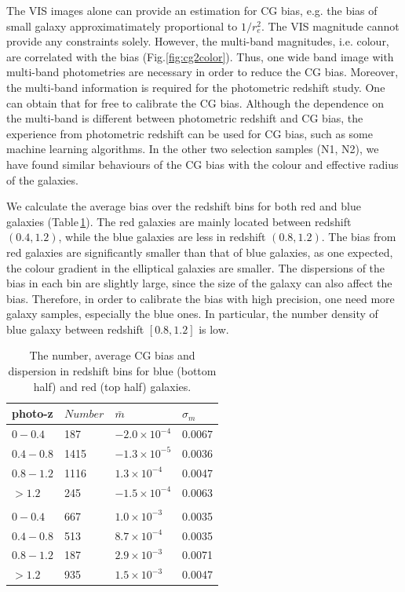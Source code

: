 \documentclass[useAMS,usenatbib]{mn2e}
\begin{document}
The VIS images alone can provide an estimation for CG bias, e.g. the
bias of small galaxy approximatimately proportional to $1/r_e^2$. The
VIS magnitude cannot provide any constraints solely. However, the multi-band
magnitudes, i.e. colour, are correlated with the bias
(Fig.\ref{fig:cg2color}). Thus, one wide band image with multi-band
photometries are necessary in order to reduce the CG bias. Moreover, the
multi-band information is required for the photometric redshift
study. One can obtain that for free to calibrate the CG bias. Although
the dependence on the multi-band is different between photometric
redshift and CG bias, the experience from photometric redshift can be
used for CG bias, such as some machine learning algorithms. In the other two
selection samples (N1, N2), we have found similar behaviours of the CG bias
with the colour and effective radius of the galaxies.



We calculate the average bias over the redshift bins for both red and
blue galaxies (Table\,\ref{table:calibration}). The red galaxies
are mainly located between redshift $(0.4,1.2)$, while the blue galaxies
are less in redshift $(0.8,1.2)$. The bias from red galaxies are
significantly smaller than that of blue galaxies, as one expected, the
colour gradient in the elliptical galaxies are smaller. The
dispersions of the bias in each bin are slightly large, since the size
of the galaxy can also affect the bias. Therefore, in order to
calibrate the bias with high precision, one need more galaxy samples,
especially the blue ones. In particular, the number density of blue
galaxy between redshift $[0.8,1.2]$ is low.


\begin{center}
\begin{table}
  \begin{tabular}{llll}
    \hline
    photo-z    &$Number$  &$\bar{m}$  &$\sigma_m$ \\
    \hline
    $0-0.4$   &187  &$-2.0\times10^{-4}$  &$0.0067$\\
    $0.4-0.8$  &1415 &$-1.3\times10^{-5}$  &$0.0036$\\
    $0.8-1.2$  &1116 &$1.3\times10^{-4}$  &0.0047\\
    $>1.2$  &245  &$-1.5\times10^{-4}$  &0.0063\\
    \\
    $0-0.4$  &667  &$1.0\times10^{-3}$  &0.0035\\
    $0.4-0.8$ &513  &$8.7\times10^{-4}$  &0.0035\\
    $0.8-1.2$ &187  &$2.9\times10^{-3}$  &0.0071\\
    $>1.2$  &935  &$1.5\times10^{-3}$  &0.0047\\
    \hline
  \end{tabular}
  \caption{\label{table:calibration}The number, average CG bias and dispersion in redshift bins for blue (bottom half) and red (top half) galaxies. }
\end{table}
\end{center}
\end{document}
